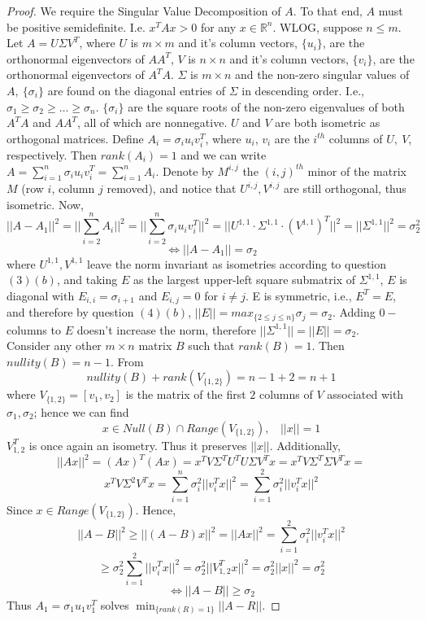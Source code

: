 \documentclass[11pt]{article}
\theoremstyle{quest}
\begin{document}
\begin{proof}
We require the Singular Value Decomposition of $A$. To that end, $A$ must be positive semidefinite. I.e. $x^TAx > 0$ for any $x \in \mathbb{R}^n$. WLOG, suppose $n \le m$. Let $A = U \Sigma V^T$, where $U$ is $m \times m$ and it's column vectors, $\{u_i\}$, are the orthonormal eigenvectors of $AA^T$, $V$ is $n \times n$ and it's column vectors, $\{v_i\}$, are the orthonormal eigenvectors of $A^TA$. $\Sigma$ is $m \times n$ and the non-zero singular values of $A,\ \{\sigma_i\}$ are found on the diagonal entries of $\Sigma$ in descending order. I.e., $\sigma_1 \ge \sigma_2 \ge \ldots \ge \sigma_n$. $\{\sigma_i\}$ are the square roots of the non-zero eigenvalues of both $A^TA$ and $AA^T$, all of which are nonnegative. $U$ and $V$ are both isometric as orthogonal matrices. Define $A_i = \sigma_i u_iv_i^T$, where $u_i$, $v_i$ are the $i^{th}$ columns of $U,\ V$, respectively. Then $rank(A_i) = 1$ and we can write $A = \sum_{i = 1}^n \sigma_i u_iv_i^T = \sum_{i = 1}^n A_i$. Denote by $M^{i,j}$ the $(i, j)^{th}$ minor of the matrix $M$ (row $i$, column $j$ removed), and notice that $U^{i,j}, V^{i,j}$ are still orthogonal, thus isometric. Now,
$$||A - A_1||^2 = ||\sum_{i=2}^n A_i||^2 = ||\sum_{i=2}^n \sigma_i u_i v_i^T||^2 = ||U^{1,1} \cdot \Sigma^{1,1} \cdot (V^{1,1})^T||^2 = ||\Sigma^{1,1}||^2 = \sigma_2^2$$
$$\iff ||A - A_1|| = \sigma_2$$
where $U^{1,1}, V^{1,1}$ leave the norm invariant as isometries according to question $(3)(b)$, and taking $E$ as the largest upper-left square submatrix of $\Sigma^{1,1}$, $E$ is diagonal with $E_{i,i} = \sigma_{i+1}$ and $E_{i,j} = 0$ for $i \ne j$. E is symmetric, i.e., $E^T=E$, and therefore by question $(4)(b)$, $||E|| = max_{\{2 \le j \le n\}} \sigma_j = \sigma_2$. Adding $0-$columns to $E$ doesn't increase the norm, therefore $||\Sigma^{1,1}||=||E|| = \sigma_2$.
\\Consider any other $m \times n$ matrix $B$ such that $rank(B) = 1$. Then $nullity(B) = n-1$. From
$$nullity(B) + rank(V_{\{1,2\}}) = n - 1 + 2 = n+1$$
where $V_{\{1,2\}}=[v_1, v_2]$ is the matrix of the first $2$ columns of $V$ associated with $\sigma_1, \sigma_2$; hence we can find
$$x \in Null(B) \cap Range(V_{\{1,2\}}),\ \ \ \ ||x|| = 1$$
$V_{1,2}^T$ is once again an isometry. Thus it preserves $||x||$. Additionally,
$$||Ax||^2 = (Ax)^T(Ax) = x^T V \Sigma^T U^T U \Sigma V^T x = x^T V \Sigma^T \Sigma V^T x =$$
$$x^T V \Sigma^2 V^T x = \sum_{i=1}^n \sigma_i^2 ||v_i^T x||^2 = \sum_{i=1}^2 \sigma_i^2 ||v_i^T x||^2$$
Since $x \in Range(V_{\{1,2\}})$. Hence,
$$||A-B||^2 \ge ||(A-B)x||^2 = ||Ax||^2  = \sum_{i=1}^2 \sigma_i^2 ||v_i^T x||^2$$
$$\ge \sigma_2^2 \sum_{i=1}^2||v_i^T x||^2 = \sigma_2^2 ||V_{1,2}^Tx||^2 = \sigma_2^2 ||x||^2 = \sigma_2^2$$
$$\iff ||A-B|| \ge \sigma_2$$
Thus $A_1 = \sigma_1 u_1 v_1^T$ solves $ \min_{\{rank(R) = 1\}}||A-R||$.
\end{proof}
\end{document}
